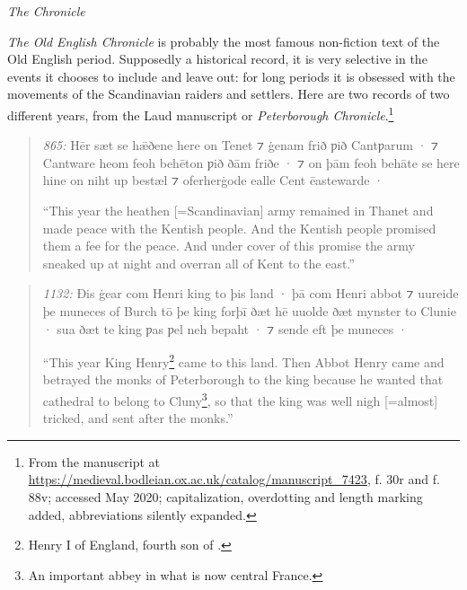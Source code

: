 \begin{texts}{\textit{The Chronicle}}\label{OE-chronicle}

\textit{The Old English Chronicle} is probably the most famous non-fiction text of the Old English period. Supposedly a historical record, it is very selective in the events it chooses to include and leave out: for long periods it is obsessed with the movements of the Scandinavian raiders and settlers. Here are two records of two different years, from the Laud manuscript or \textit{Peterborough Chronicle}.\footnote{From the manuscript at \url{https://medieval.bodleian.ox.ac.uk/catalog/manuscript_7423}, f. 30r and f. 88v; accessed May 2020; capitalization, overdotting and length marking added, abbreviations silently expanded.}

\begin{quote}
    \internallinenumbers*{}
    \emph{865:} Hēr sæt se hǣðene here on Tenet ⁊ ġenam frið ƿið Cantƿarum · ⁊ Cantware heom feoh behēton ƿið ðām friðe · ⁊ on þām feoh behāte se here hine on niht up bestæl ⁊ oferherġode ealle Cent ēastewarde ·

    ``This year the heathen [=Scandinavian] army remained in Thanet and made peace with the Kentish people. And the Kentish people promised them a fee for the peace. And under cover of this promise the army sneaked up at night and overran all of Kent to the east.''
\end{quote}

\begin{quote}
    \internallinenumbers*{}
    \emph{1132:} Ðis ġear com Henri king to þis land · þā com Henri abbot ⁊ uureide þe muneces of Burch tō þe king forþī ðæt hē uuolde ðæt mynster to Clunie · sua ðæt te king ƿas ƿel neh bepaht · ⁊ sende eft þe muneces ·

    ``This year King Henry\footnote{Henry I of England, fourth son of .} came to this land. Then Abbot Henry came and betrayed the monks of Peterborough to the king because he wanted that cathedral to belong to Cluny\footnote{An important abbey in what is now central France.}, so that the king was well nigh [=almost] tricked, and sent after the monks.''
\end{quote}
\end{texts}

